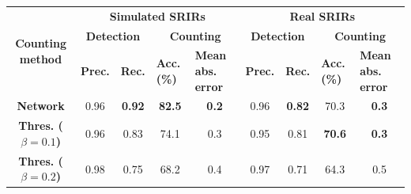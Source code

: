 \begin{table}[t]
    \begin{adjustbox}{width=1.1\textwidth,center}
    \begin{tabular}{|c|cccc|cccc|}
        \hline
        \multirow{3}{*}{\textbf{Counting method}} & \multicolumn{4}{c|}{\textbf{Simulated SRIRs}}                                                                                                                   & \multicolumn{4}{c|}{\textbf{Real SRIRs}}                                                                                                                        \\ \cline{2-9} 
                                                  & \multicolumn{2}{c}{\textbf{Detection}}                                & \multicolumn{2}{c|}{\textbf{Counting}}                                                  & \multicolumn{2}{c}{\textbf{Detection}}                                & \multicolumn{2}{c|}{\textbf{Counting}}                                                 \\
                                                  & \multicolumn{1}{l}{\textbf{Prec.}} & \multicolumn{1}{l}{\textbf{Rec.}} & \multicolumn{1}{l}{\textbf{Acc. (\%)}} & \multicolumn{1}{l|}{\textbf{Mean abs. error}} & \multicolumn{1}{l}{\textbf{Prec.}} & \multicolumn{1}{l}{\textbf{Rec.}} & \multicolumn{1}{l}{\textbf{Acc. (\%)}} & \multicolumn{1}{l|}{\textbf{Mean abs. error}} \\ \hline
        \textbf{Network}                          & 0.96                               & \textbf{0.92}                     & \textbf{82.5}                          & \textbf{0.2}                                  & 0.96                               & \textbf{0.82}                     & 70.3                                   & \textbf{0.3}                                  \\
        \textbf{Thres. ($\beta = 0.1$)}           & 0.96                               & 0.83                              & 74.1                                   & 0.3                                           & 0.95                               & 0.81                              & \textbf{70.6}                          & \textbf{0.3}                                  \\
        \textbf{Thres. ($\beta = 0.2$)}           & 0.98                               & 0.75                              & 68.2                                   & 0.4                                           & 0.97                               & 0.71                              & 64.3                                   & 0.5                                           \\

\end{tabular}
\end{adjustbox}
\end{table}
